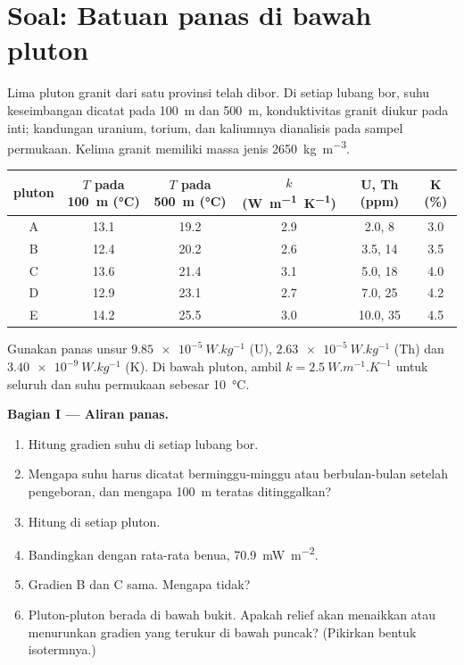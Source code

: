 \section{Soal: Batuan panas di bawah pluton}

\begin{problem}
\label{pb:b1:heat-budget:1}
Lima pluton granit dari satu provinsi telah dibor. Di setiap lubang bor, suhu keseimbangan dicatat pada \qty{100}{m} dan \qty{500}{m}, konduktivitas granit diukur pada inti; kandungan uranium, torium, dan kaliumnya dianalisis pada sampel permukaan. Kelima granit memiliki massa jenis \qty{2650}{kg.m^{-3}}.
\begin{center}
\small
\begin{tabular}{cccccc}
\hline
pluton & $T$ pada \qty{100}{m} (\unit{\degreeCelsius}) & $T$ pada \qty{500}{m} (\unit{\degreeCelsius}) & $k$ (\unit{W.m^{-1}.K^{-1}}) & U, Th (ppm) & K (\unit{\percent}) \\
\hline
A & 13.1 & 19.2 & 2.9 & 2.0, 8 & 3.0 \\
B & 12.4 & 20.2 & 2.6 & 3.5, 14 & 3.5 \\
C & 13.6 & 21.4 & 3.1 & 5.0, 18 & 4.0 \\
D & 12.9 & 23.1 & 2.7 & 7.0, 25 & 4.2 \\
E & 14.2 & 25.5 & 3.0 & 10.0, 35 & 4.5 \\
\hline
\end{tabular}
\end{center}
Gunakan panas unsur $\qty{9.85e-5}{W.kg^{-1}}$ (U), $\qty{2.63e-5}{W.kg^{-1}}$
(Th) dan $\qty{3.40e-9}{W.kg^{-1}}$ (K). Di bawah pluton, ambil $k = \qty{2.5}{W.m^{-1}.K^{-1}}$ untuk seluruh  dan suhu permukaan sebesar \qty{10}{\degreeCelsius}.

\medskip
\noindent\textbf{Bagian I --- Aliran panas.}
\begin{enumerate}
  \item Hitung gradien suhu di setiap lubang bor.
  \item Mengapa suhu harus dicatat berminggu-minggu atau berbulan-bulan setelah pengeboran, dan mengapa \qty{100}{m} teratas ditinggalkan?
  \item Hitung  di setiap pluton.
  \item Bandingkan dengan  rata-rata benua, \qty{70.9}{mW.m^{-2}}.
  \item Gradien B dan C sama. Mengapa  tidak?
  \item Pluton-pluton berada di bawah bukit. Apakah relief akan menaikkan atau menurunkan gradien yang terukur di bawah puncak? (Pikirkan bentuk isotermnya.)
\end{enumerate}


\end{problem}
